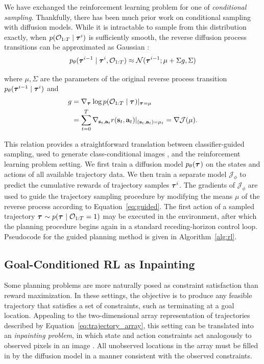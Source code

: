 We have exchanged the reinforcement learning problem for one of \emph{conditional sampling}.
Thankfully, there has been much prior work on conditional sampling with diffusion models.
While it is intractable to sample from this distribution exactly, when $p(\mathcal{O}_{1:T} \mid \bm{\tau}^{i})$ is sufficiently smooth, the reverse diffusion process transitions can be approximated as Gaussian \citep{sohldickstein2015nonequilibrium}:
\begin{equation}
\label{eq:guided}
p_\theta(\bm{\tau}^{i-1} \mid \bm{\tau}^{i}, \mathcal{O}_{1:T}) \approx \mathcal{N}(\bm{\tau}^{i-1}; \mu + \Sigma g, \Sigma)
\end{equation}

where $\mu, \Sigma$ are the parameters of the original reverse process transition $p_\theta(\bm{\tau}^{i-1} \mid \bm{\tau}^{i})$ and
\begin{align*}
g &= \nabla_{\bm{\tau}^{}} \log p(\mathcal{O}_{1:T} \mid \bm{\tau}^{}) |_{\bm{\tau}^{} = \mu} \\
&= \sum_{t=0}^{T} \nabla_{\mathbf{s}_t,\mathbf{a}_t} r(\mathbf{s}_t, \mathbf{a}_t) |_{(\mathbf{s}_t,\mathbf{a}_t)=\mu_t}
= \nabla \mathcal{J}(\mu).
\end{align*}
\vspace{-.45cm}

This relation provides a straightforward translation between classifier-guided sampling, used to generate class-conditional images \citep{dhariwal2021diffusion}, and the reinforcement learning problem setting.
We first train a diffusion model $p_\theta(\bm{\tau}^{})$ on the states and actions of all available trajectory data.
We then train a separate model $\mathcal{J}_\phi$ to predict the cumulative rewards of trajectory samples $\bm{\tau}^{i}$.
The gradients of $\mathcal{J}_\phi$ are used to guide the trajectory sampling procedure by modifying the means $\mu$ of the reverse process according to Equation~\ref{eq:guided}.
The first action of a sampled trajectory ${\bm{\tau}^{} \sim p(\bm{\tau}^{} \mid \mathcal{O}_{1:T}=1)}$ may be executed in the environment, after which the planning procedure begins again in a standard receding-horizon control loop.
Pseudocode for the guided planning method is given in Algorithm~\ref{alg:rl}.

\subsection{Goal-Conditioned RL as Inpainting}
\label{sec:inpainting}

Some planning problems are more naturally posed as constraint satisfaction than reward maximization.
In these settings, the objective is to produce any feasible trajectory that satisfies a set of constraints, such as terminating at a goal location.
Appealing to the two-dimensional array representation of trajectories described by Equation~\ref{eq:trajectory_array}, this setting can be translated into an \emph{inpainting problem}, in which state and action constraints act analogously to observed pixels in an image \citep{sohldickstein2015nonequilibrium}.
All unobserved locations in the array must be filled in by the diffusion model in a manner consistent with the observed constraints.

